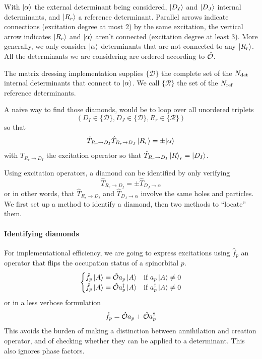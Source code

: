 \documentclass[./thesis.tex]{subfiles}
\begin{document}
With ${\ket{\alpha}}$ the external determinant being considered, $\ket {D_I}$ and $\ket {D_J}$ internal determinants, and $\ket {R_r}$ a reference determinant.  Parallel arrows indicate connections (excitation degree at most 2) by the same excitation, the vertical arrow indicates $\ket {R_r}$ and ${\ket{\alpha}}$ aren't connected (excitation degree at least 3). More generally, we only consider ${\ket{\alpha}}$ determinants that are not connected to any $\ket {R_r}$. All the determinants we are considering are ordered according to ${\hat{\mathcal{O}}}$.

The matrix dressing implementation supplies $\{\mathcal{D}\}$ the complete set of the ${N_\text{det}}$ internal determinants that connect to ${\ket{\alpha}}$. We call $\{\mathcal{R}\}$ the set of the ${N_\text{ref}}$ reference determinants.

A naive way to find those diamonds, would be to loop over all unordered triplets 
\begin{equation}
(D_I \in \{\mathcal{D}\}, D_J \in \{\mathcal{D}\}, R_r \in \{\mathcal{R}\})
\end{equation}
so that
\begin{equation}
\hat T_{R_r \rightarrow D_I} \hat T_{R_r \rightarrow D_J} \ket {R_r} = \pm {\ket{\alpha}}
\end{equation}
with $\hat T_{R_r \rightarrow D_I}$ the excitation operator so that $\hat T_{R_r \rightarrow D_I} \ket R_r = {\ket{D_I}}$.


Using excitation operators, a diamond can be identified by only verifying
\begin{equation}
\hat T_{R_r \rightarrow D_I} = \pm \hat T_{D_J \rightarrow \alpha}
\label{eq:excitation_diamond}
\end{equation}
or in other words, that $\hat T_{R_r \rightarrow D_I}$ and $\hat T_{D_J \rightarrow \alpha}$ involve the same holes and particles.
We first set up a method to identify a diamond, then two methods to ``locate'' them.


\paragraph{Identifying diamonds}
For implementational efficiency, we are going to express excitations using $\hat f_p$ an operator that flips the occupation status of a spinorbital $p$.
\begin{align}
  \begin{cases}
  \hat f_p \ket A = {\hat{\mathcal{O}}} a_p \ket A & \text{if }  a_p \ket A \neq 0\\
  \hat f_p \ket A = {\hat{\mathcal{O}}} a^\dagger_p \ket A & \text{if }  a^\dagger_p  \ket A \neq 0\\
  \end{cases}
\end{align}
or in a less verbose formulation
\begin{equation}
\hat f_p = {\hat{\mathcal{O}}} a_p + {\hat{\mathcal{O}}} a^\dagger_p
\end{equation}
This avoids the burden of making a distinction between annihilation and creation operator, and of checking whether they can be applied to a determinant. This also ignores phase factors.
\end{document}
